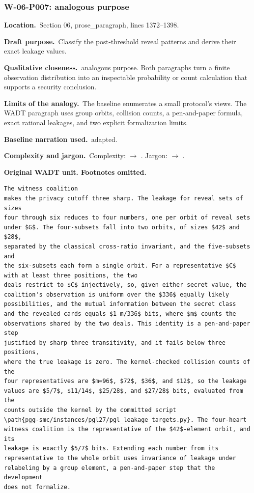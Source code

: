 \documentclass[10pt]{article}
\newcommand{\Field}[2]{\textbf{#1}\ #2\par}\newcommand{\Tag}[1]{\fcolorbox{black!25}{black!4}{\strut\scriptsize #1}}
\begin{document}
\par\smallskip
{}\subsubsection*{W-06-P007: analogous purpose}
\Field{Location.}{Section 06, prose\_paragraph, lines 1372--1398.}
\Field{Draft purpose.}{Classify the post-threshold reveal patterns and derive their exact leakage values.}
\Field{Qualitative closeness.}{analogous purpose. Both paragraphs turn a finite observation distribution into an inspectable probability or count calculation that supports a security conclusion.}
\Field{Limits of the analogy.}{The baseline enumerates a small protocol's views. The WADT paragraph uses group orbits, collision counts, a pen-and-paper formula, exact rational leakages, and two explicit formalization limits.}
\Field{Baseline narration used.}{adapted.}
\Field{Complexity and jargon.}{Complexity: \Tag{high} $\rightarrow$ \Tag{high}. Jargon: \Tag{high} $\rightarrow$ \Tag{high}.}
\textbf{Original WADT unit. Footnotes omitted.}
\begin{lstlisting}
The witness coalition
makes the privacy cutoff three sharp. The leakage for reveal sets of sizes
four through six reduces to four numbers, one per orbit of reveal sets
under $G$. The four-subsets fall into two orbits, of sizes $42$ and $28$,
separated by the classical cross-ratio invariant, and the five-subsets and
the six-subsets each form a single orbit. For a representative $C$ with at least three positions, the two
deals restrict to $C$ injectively, so, given either secret value, the
coalition's observation is uniform over the $336$ equally likely
possibilities, and the mutual information between the secret class
and the revealed cards equals $1-m/336$ bits, where $m$ counts the
observations shared by the two deals. This identity is a pen-and-paper step
justified by sharp three-transitivity, and it fails below three positions,
where the true leakage is zero. The kernel-checked collision counts of the
four representatives are $m=96$, $72$, $36$, and $12$, so the leakage
values are $5/7$, $11/14$, $25/28$, and $27/28$ bits, evaluated from the
counts outside the kernel by the committed script
\path{pgg-smc/instances/pgl27/pgl_leakage_targets.py}. The four-heart
witness coalition is the representative of the $42$-element orbit, and its
leakage is exactly $5/7$ bits. Extending each number from its
representative to the whole orbit uses invariance of leakage under
relabeling by a group element, a pen-and-paper step that the development
does not formalize.
\end{lstlisting}
\end{document}
